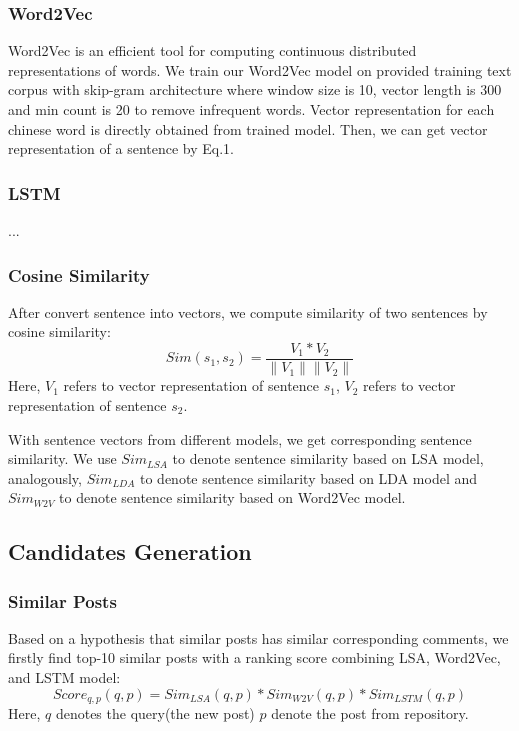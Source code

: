 \documentclass{llncs}
\begin{document}
\subsubsection{Word2Vec}
Word2Vec is an efficient tool for computing continuous distributed 
representations of words\cite{Mikolov}. We train our Word2Vec model on provided training 
text corpus with skip-gram architecture where window size is 10, vector 
length is 300 and min count is 20 to remove infrequent words. Vector 
representation for each chinese word is directly obtained from trained model. 
Then, we can get vector representation of a sentence by Eq.1.

\subsubsection{LSTM}
...

\subsubsection{Cosine Similarity} 
After convert sentence into vectors, we compute similarity of two sentences by cosine similarity:
\begin{equation}
   Sim(s_1, s_2) = \frac{V_1 * V_2}{\left \| V_1 \right \| \left \| V_2 \right \|}
\end{equation}
Here, $V_1$ refers to vector representation of sentence $s_1$, $V_2$ refers to vector representation of sentence $s_2$.

With sentence vectors from different models, we get corresponding sentence similarity. We use $Sim_{LSA}$ to denote sentence similarity based on LSA model, analogously, $Sim_{LDA}$ to denote sentence similarity based on LDA model and $Sim_{W2V}$ to denote sentence similarity based on Word2Vec model.

\subsection{Candidates Generation}

\subsubsection{Similar Posts}
Based on a hypothesis that similar posts has similar corresponding comments, we firstly find top-10 similar posts with a ranking score combining LSA, Word2Vec, and LSTM model:
\begin{equation}
   Score_{q,p}(q, p) = Sim_{LSA}(q, p) * Sim_{W2V}(q, p) * Sim_{LSTM}(q, p)
\end{equation}
Here, $q$ denotes the query(the new post) $p$ denote the post from repository.
\end{document}
